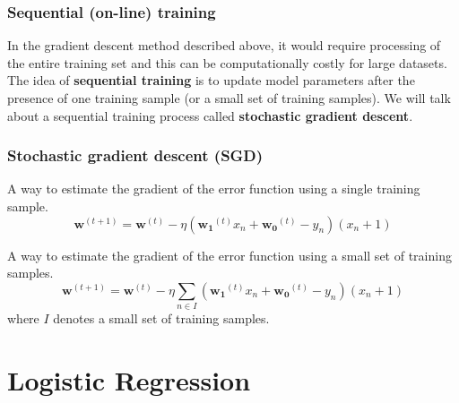\documentclass[11pt,fleqn]{book} %
\begin{document}
\subsection{Sequential (on-line) training}
In the gradient descent method described above, it would require processing of the entire training set and this can be computationally costly for large datasets. The idea of \textbf{sequential training} is to update model parameters after the presence of one training sample (or a small set of training samples). We will talk about a sequential training process called \textbf{stochastic gradient descent}.

\subsection*{Stochastic gradient descent (SGD)}
\begin{definition}
	A way to estimate the gradient of the error function using a single training sample.
	$$\bm{w}^{(t+1)} = \bm{w}^{(t)} - \eta (\bm{w_1}^{(t)}x_n + \bm{w_0}^{(t)} - y_n)(x_n + 1)$$
\end{definition}

\begin{definition}
	A way to estimate the gradient of the error function using a small set of training samples.
	$$\bm{w}^{(t+1)} = \bm{w}^{(t)} - \eta \sum_{n \in I}(\bm{w_1}^{(t)}x_n + \bm{w_0}^{(t)} - y_n)(x_n + 1)$$
	where $I$ denotes a small set of training samples.
\end{definition}


\chapter{Logistic Regression}


\end{document}
